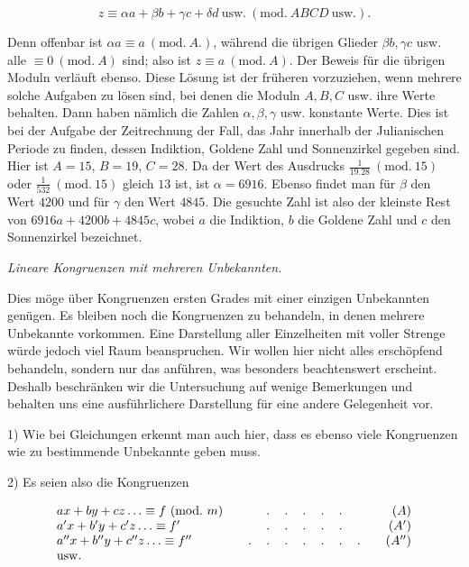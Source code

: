 \[
z\equiv\alpha a+\beta b+\gamma c+\delta d\ \mathrm{usw.}\ (\mathrm{mod.}\ ABCD\ \mathrm{usw.}).
\]

Denn offenbar ist $\alpha a\equiv a\ (\mathrm{mod.}\ A.)$, während die übrigen Glieder $\beta b,\gamma c$ usw. alle $\equiv 0\ (\mathrm{mod.}\ A)$ sind; also ist $z\equiv a\ (\mathrm{mod.}\ A)$. Der Beweis für die übrigen Moduln verläuft ebenso. Diese Lösung ist der früheren vorzuziehen, wenn mehrere solche Aufgaben zu lösen sind, bei denen die Moduln $A,B,C$ usw. ihre Werte behalten. Dann haben nämlich die Zahlen $\alpha,\beta,\gamma$ usw. konstante Werte. Dies ist bei der Aufgabe der Zeitrechnung der Fall, das Jahr innerhalb der Julianischen Periode zu finden, dessen Indiktion, Goldene Zahl und Sonnenzirkel gegeben sind. Hier ist $A=15$, $B=19$, $C=28$. Da
der Wert des Ausdrucks $\frac{1}{19.28}\ (\mathrm{mod.}\ 15)$ oder $\frac{1}{532}\ (\mathrm{mod.}\ 15)$ gleich $13$ ist, ist $\alpha=6916$. Ebenso findet man für $\beta$ den Wert $4200$ und für $\gamma$ den Wert $4845$. Die gesuchte Zahl ist also der kleinste Rest von $6916a+4200b+4845c$, wobei $a$ die Indiktion, $b$ die Goldene Zahl und $c$ den Sonnenzirkel bezeichnet.

\begin{center}\emph{Lineare Kongruenzen mit mehreren Unbekannten.}\end{center}


Dies möge über Kongruenzen ersten Grades mit einer einzigen Unbekannten genügen. Es bleiben noch die Kongruenzen zu behandeln, in denen mehrere Unbekannte vorkommen. Eine Darstellung aller Einzelheiten mit voller Strenge würde jedoch viel Raum beanspruchen. Wir wollen hier nicht alles erschöpfend behandeln, sondern nur das anführen, was besonders beachtenswert erscheint. Deshalb beschränken wir die Untersuchung auf wenige Bemerkungen und behalten uns eine ausführlichere Darstellung für eine andere Gelegenheit vor.

1) Wie bei Gleichungen erkennt man auch hier, dass es ebenso viele Kongruenzen wie zu bestimmende Unbekannte geben muss.

2) Es seien also die Kongruenzen

\[
\begin{array}{l@{\qquad}c@{\qquad}r}
ax+by+cz\ldots\equiv f\ (\mathrm{mod.}\ m)&\ldotp\quad\ldotp\quad\ldotp\quad\ldotp\quad\ldotp&(A)\\
a'x+b'y+c'z\ldots\equiv f'&\ldotp\quad\ldotp\quad\ldotp\quad\ldotp\quad\ldotp&(A')\\
a''x+b''y+c''z\ldots\equiv f''&\ldotp\quad\ldotp\quad\ldotp\quad\ldotp\quad\ldotp\quad\ldotp\quad\ldotp&(A'')\\
\mathrm{usw.}&&
\end{array}
\]

